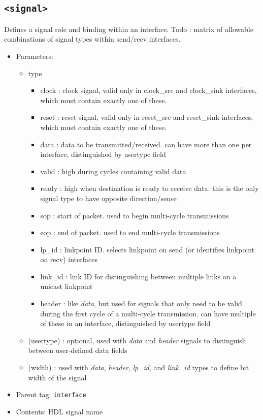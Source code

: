 \documentclass{article}
\begin{document}
\subsection{\texttt{<signal>}}

Defines a signal role and binding within an interface. Todo : matrix of allowable combinations of signal types within send/recv interfaces.

\begin{itemize}
\item{Parameters:}
\begin{itemize}
\item{type}
\begin{itemize}
\item{clock : clock signal, valid only in clock\_src and clock\_sink interfaces, which must contain exactly one of these.}
\item{reset : reset signal, valid only in reset\_src and reset\_sink interfaces, which must contain exactly one of these.}
\item{data : data to be transmitted/received. can have more than one per interface, distinguished by usertype field}
\item{valid : high during cycles containing valid data}
\item{ready : high when destination is ready to receive data. this is the only signal type to have opposite direction/sense} 
\item{sop : start of packet. used to begin multi-cycle transmissions}
\item{eop : end of packet. used to end multi-cycle transmissions}
\item{lp\_id : linkpoint ID. selects linkpoint on send (or identifies linkpoint on recv) interfaces}
\item{link\_id : link ID for distinguishing between multiple links on a unicast linkpoint}
\item{header : like \textit{data}, but used for signals that only need to be valid during the first cycle of a multi-cycle transmission. can have multiple of these in an interface, distinguished by usertype field}
\end{itemize}
\item{(usertype) : optional, used with \textit{data} and \textit{header} signals to distinguish between user-defined data fields}
\item{(width) : used with \textit{data}, \textit{header}, \textit{lp\_id}, and \textit{link\_id} types to define bit width of the signal}
\end{itemize}
\item{Parent tag: \texttt{interface}}
\item{Contents: HDL signal name}
\end{itemize}
\end{document}

